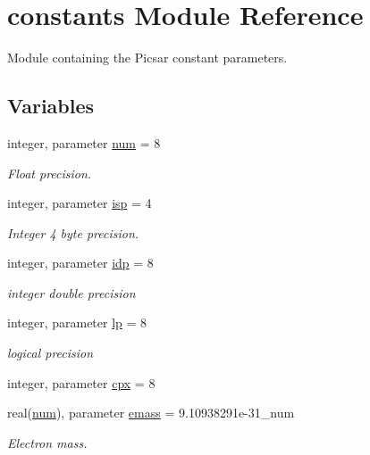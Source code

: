 \hypertarget{namespaceconstants}{}\section{constants Module Reference}
\label{namespaceconstants}


Module containing the Picsar constant parameters.  


\subsection*{Variables}
\begin{DoxyCompactItemize}
\item 
integer, parameter \hyperlink{namespaceconstants_afe19f7f8af171411c51fb763b36e3823}{num} = 8
\begin{DoxyCompactList}\small\item\em Float precision. \end{DoxyCompactList}\item 
integer, parameter \hyperlink{namespaceconstants_a5a2ae450a00d2a29f9b70dcb776f7a2f}{isp} = 4
\begin{DoxyCompactList}\small\item\em Integer 4 byte precision. \end{DoxyCompactList}\item 
integer, parameter \hyperlink{namespaceconstants_ae345db51770e3628e6aaf76e6a45e160}{idp} = 8
\begin{DoxyCompactList}\small\item\em integer double precision \end{DoxyCompactList}\item 
integer, parameter \hyperlink{namespaceconstants_abcbe699dae64804bc375533c0f40c6b1}{lp} = 8
\begin{DoxyCompactList}\small\item\em logical precision \end{DoxyCompactList}\item 
integer, parameter \hyperlink{namespaceconstants_a5709f0ae2ee52b1906446ad25ed0f587}{cpx} = 8
\item 
real(\hyperlink{namespaceconstants_afe19f7f8af171411c51fb763b36e3823}{num}), parameter \hyperlink{namespaceconstants_ad39536f583f0861abb2fb19a27c56fc8}{emass} = 9.\+10938291e-\/31\+\_\+num
\begin{DoxyCompactList}\small\item\em Electron mass. \end{DoxyCompactList}\item 

\end{DoxyCompactItemize}
